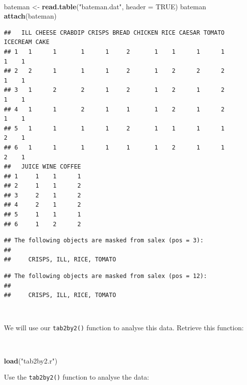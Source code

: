 \documentclass[12pt,a4paper]{book}
\newenvironment{Shaded}{\begin{snugshade}}{\end{snugshade}}
\newcommand{\DataTypeTok}[1]{\textcolor[rgb]{0.13,0.29,0.53}{#1}}
\newcommand{\KeywordTok}[1]{\textcolor[rgb]{0.13,0.29,0.53}{\textbf{#1}}}
\newcommand{\NormalTok}[1]{#1}
\newcommand{\OtherTok}[1]{\textcolor[rgb]{0.56,0.35,0.01}{#1}}
\newcommand{\StringTok}[1]{\textcolor[rgb]{0.31,0.60,0.02}{#1}}
\theoremstyle{definition}
\theoremstyle{definition}
\theoremstyle{definition}
\theoremstyle{remark}
\begin{document}
~

\begin{Shaded}
\begin{Highlighting}[]
\NormalTok{bateman <-}\StringTok{ }\KeywordTok{read.table}\NormalTok{(}\StringTok{"bateman.dat"}\NormalTok{, }\DataTypeTok{header =} \OtherTok{TRUE}\NormalTok{)}
\NormalTok{bateman}
\KeywordTok{attach}\NormalTok{(bateman)}
\end{Highlighting}
\end{Shaded}

\begin{verbatim}
##   ILL CHEESE CRABDIP CRISPS BREAD CHICKEN RICE CAESAR TOMATO ICECREAM CAKE
## 1   1      1       1      1     2       1    1      1      1        1    1
## 2   2      1       1      1     2       1    2      2      2        1    1
## 3   1      2       2      1     2       1    2      1      2        1    1
## 4   1      1       2      1     1       1    2      1      2        1    1
## 5   1      1       1      1     2       1    1      1      1        2    1
## 6   1      1       1      1     1       1    2      1      1        2    1
##   JUICE WINE COFFEE
## 1     1    1      1
## 2     1    1      2
## 3     2    1      2
## 4     2    1      2
## 5     1    1      1
## 6     1    2      2
\end{verbatim}

\begin{verbatim}
## The following objects are masked from salex (pos = 3):
## 
##     CRISPS, ILL, RICE, TOMATO
\end{verbatim}

\begin{verbatim}
## The following objects are masked from salex (pos = 12):
## 
##     CRISPS, ILL, RICE, TOMATO
\end{verbatim}

~

We will use our \texttt{tab2by2()} function to analyse this data.
Retrieve this function:

~

\begin{Shaded}
\begin{Highlighting}[]
\KeywordTok{load}\NormalTok{(}\StringTok{"tab2by2.r"}\NormalTok{)}
\end{Highlighting}
\end{Shaded}

\newpage

Use the \texttt{tab2by2()} function to analyse the data:

~
\end{document}
